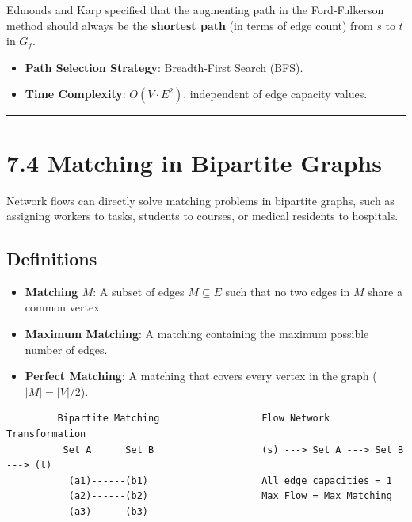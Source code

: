 \documentclass[
]{book}
\providecommand{\tightlist}{%
  \setlength{\itemsep}{0pt}\setlength{\parskip}{0pt}}
\theoremstyle{definition}
\theoremstyle{definition}
\theoremstyle{definition}
\theoremstyle{definition}
\theoremstyle{remark}
\begin{document}
Edmonds and Karp specified that the augmenting path in the Ford-Fulkerson method should always be the \textbf{shortest path} (in terms of edge count) from \(s\) to \(t\) in \(G_f\).

\begin{itemize}
\tightlist
\item
  \textbf{Path Selection Strategy}: Breadth-First Search (BFS).
\item
  \textbf{Time Complexity}: \(O(V \cdot E^2)\), independent of edge capacity values.
\end{itemize}

\begin{center}\rule{0.5\linewidth}{0.5pt}\end{center}

\section{7.4 Matching in Bipartite Graphs}\label{matching-in-bipartite-graphs}

Network flows can directly solve matching problems in bipartite graphs, such as assigning workers to tasks, students to courses, or medical residents to hospitals.

\subsection{Definitions}\label{definitions-7}

\begin{itemize}
\tightlist
\item
  \textbf{Matching \(M\)}: A subset of edges \(M \subseteq E\) such that no two edges in \(M\) share a common vertex.
\item
  \textbf{Maximum Matching}: A matching containing the maximum possible number of edges.
\item
  \textbf{Perfect Matching}: A matching that covers every vertex in the graph (\(\vert{}M\vert{} = \vert{}V\vert{} / 2\)).
\end{itemize}

\begin{verbatim}
         Bipartite Matching                  Flow Network Transformation
          Set A      Set B                   (s) ---> Set A ---> Set B ---> (t)
           (a1)------(b1)                    All edge capacities = 1
           (a2)------(b2)                    Max Flow = Max Matching
           (a3)------(b3)
\end{verbatim}
\end{document}
